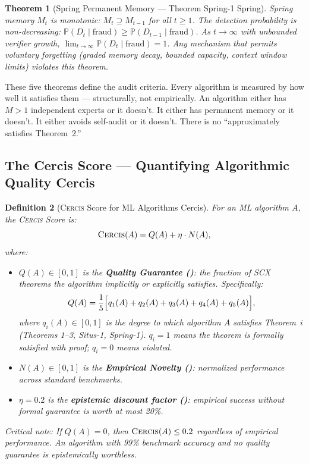 \documentclass[12pt,a4paper]{article}
\newtheorem{theorem}{Theorem}[section]
\newtheorem{definition}[theorem]{Definition}
\theoremstyle{definition}
\newcommand{\Cercis}{\textsc{Cercis}}
\newcommand{\SCX}{\textsc{SCX}}
\newcommand{\Pbb}{\mathbb{P}}
\begin{document}
\begin{theorem}[Spring Permanent Memory — Theorem Spring-1 Spring]
\label{thm:spring_formal}
Spring memory $M_t$ is monotonic: $M_t \supseteq M_{t-1}$ for all $t \ge 1$. The detection probability is non-decreasing: $\Pbb(D_t \mid \text{fraud}) \ge \Pbb(D_{t-1} \mid \text{fraud})$. As $t \to \infty$ with unbounded verifier growth, $\lim_{t \to \infty} \Pbb(D_t \mid \text{fraud}) = 1$. Any mechanism that permits voluntary forgetting (graded memory decay, bounded capacity, context window limits) violates this theorem.
\end{theorem}

These five theorems define the audit criteria. Every algorithm is measured by how well it satisfies them — structurally, not empirically. An algorithm either has $M>1$ independent experts or it doesn't. It either has permanent memory or it doesn't. It either avoids self-audit or it doesn't. There is no ``approximately satisfies Theorem~2.''

\subsection{The Cercis Score — Quantifying Algorithmic Quality Cercis}

\begin{definition}[\Cercis{} Score for ML Algorithms Cercis]
\label{def:cercis_ml}
For an ML algorithm $A$, the \Cercis{} Score is:
\begin{equation}\label{eq:cercis}
    \Cercis(A) = Q(A) + \eta \cdot N(A),
\end{equation}
where:
\begin{itemize}[nosep]
    \item $Q(A) \in [0,1]$ is the \textbf{Quality Guarantee ()}: the fraction of \SCX{} theorems the algorithm implicitly or explicitly satisfies. Specifically:
    \begin{equation}\label{eq:Q_decomposed}
        Q(A) = \frac{1}{5}\Bigl[q_1(A) + q_2(A) + q_3(A) + q_4(A) + q_5(A)\Bigr],
    \end{equation}
    where $q_i(A) \in [0,1]$ is the degree to which algorithm $A$ satisfies Theorem~$i$ (Theorems 1--3, Situs-1, Spring-1). $q_i = 1$ means the theorem is formally satisfied with proof; $q_i = 0$ means violated.
    \item $N(A) \in [0,1]$ is the \textbf{Empirical Novelty ()}: normalized performance across standard benchmarks.
    \item $\eta = 0.2$ is the \textbf{epistemic discount factor ()}: empirical success without formal guarantee is worth at most 20\%.
\end{itemize}
\textit{Critical note:} If $Q(A) = 0$, then $\Cercis(A) \le 0.2$ regardless of empirical performance. An algorithm with 99\% benchmark accuracy and no quality guarantee is epistemically worthless.
\end{definition}
\end{document}
